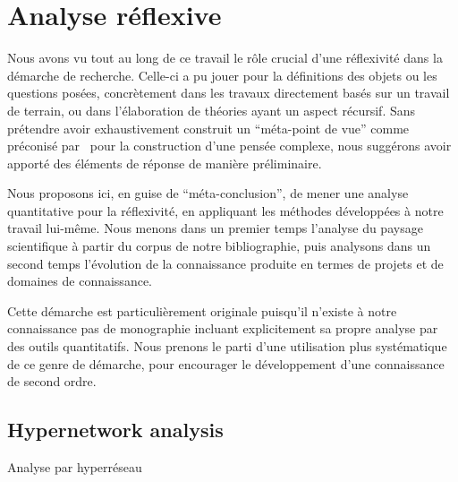 

\chapter{Analyse réflexive}




\label{app:reflexivity} %



Nous avons vu tout au long de ce travail le rôle crucial d'une réflexivité dans la démarche de recherche. Celle-ci a pu jouer pour la définitions des objets ou les questions posées, concrètement dans les travaux directement basés sur un travail de terrain, ou dans l'élaboration de théories ayant un aspect récursif. Sans prétendre avoir exhaustivement construit un ``méta-point de vue'' comme préconisé par~\cite{morin1991methode} pour la construction d'une pensée complexe, nous suggérons avoir apporté des éléments de réponse de manière préliminaire.


Nous proposons ici, en guise de ``méta-conclusion'', de mener une analyse quantitative pour la réflexivité, en appliquant les méthodes développées à notre travail lui-même. Nous menons dans un premier temps l'analyse du paysage scientifique à partir du corpus de notre bibliographie, puis analysons dans un second temps l'évolution de la connaissance produite en termes de projets et de domaines de connaissance.


Cette démarche est particulièrement originale puisqu'il n'existe à notre connaissance pas de monographie incluant explicitement sa propre analyse par des outils quantitatifs. Nous prenons le parti d'une utilisation plus systématique de ce genre de démarche, pour encourager le développement d'une connaissance de second ordre.


\section{Hypernetwork analysis}{Analyse par hyperréseau}


